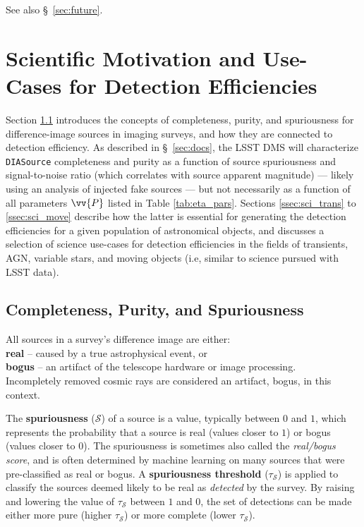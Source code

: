 \documentclass[DM,lsstdraft,toc]{lsstdoc}
\begin{document}
See also \S~\ref{sec:future}.

\section{Scientific Motivation and Use-Cases for Detection Efficiencies}\label{sec:sci}

Section \ref{ssec:sci_rb} introduces the concepts of completeness, purity, and spuriousness for difference-image sources in imaging surveys, and how they are connected to detection efficiency. As described in \S~\ref{sec:docs}, the LSST DMS will characterize {\tt DIASource} completeness and purity as a function of source spuriousness and signal-to-noise ratio (which correlates with source apparent magnitude) --- likely using an analysis of injected fake sources --- but not necessarily as a function of all parameters $\vv{P}$ listed in Table \ref{tab:eta_pars}. Sections \ref{ssec:sci_trans} to \ref{ssec:sci_move} describe how the latter is essential for generating the detection efficiencies for a given population of astronomical objects, and discusses a selection of science use-cases for detection efficiencies in the fields of transients, AGN, variable stars, and moving objects (i.e, similar to science pursued with LSST data). 

\subsection{Completeness, Purity, and Spuriousness}\label{ssec:sci_rb}

All sources in a survey's difference image are either: \\
\hspace*{10mm} {\bf real} -- caused by a true astrophysical event, or \\
\hspace*{10mm} {\bf bogus} -- an artifact of the telescope hardware or image processing. \\ 
Incompletely removed cosmic rays are considered an artifact, bogus, in this context. 

The {\bf spuriousness} ($\mathcal{S}$) of a source is a value, typically between $0$ and $1$, which represents the probability that a source is real (values closer to $1$) or bogus (values closer to $0$). The spuriousness is sometimes also called the {\it real/bogus score}, and is often determined by machine learning on many sources that were pre-classified as real or bogus. A {\bf spuriousness threshold} ($\tau_{\mathcal{S}}$) is applied to classify the sources deemed likely to be real as {\it detected} by the survey. By raising and lowering the value of $\tau_{\mathcal{S}}$ between $1$ and $0$, the set of detections can be made either more pure (higher $\tau_{\mathcal{S}}$) or more complete (lower $\tau_{\mathcal{S}}$). 
\end{document}
